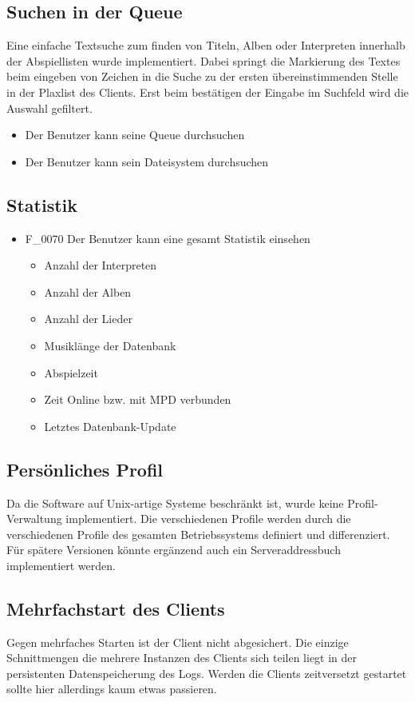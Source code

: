 \subsection{Suchen in der Queue}
Eine einfache Textsuche zum finden von Titeln, Alben oder Interpreten innerhalb der 
Abspiellisten wurde implementiert. Dabei springt die Markierung des Textes beim 
eingeben von Zeichen in die Suche zu der ersten übereinstimmenden Stelle in der 
Plaxlist des Clients. Erst beim bestätigen der Eingabe im Suchfeld wird die Auswahl 
gefiltert.
\begin{itemize}
	\item Der Benutzer kann seine Queue durchsuchen
	\item Der Benutzer kann sein Dateisystem durchsuchen
\end{itemize}
\subsection{Statistik}
\begin{itemize}
	\item F\_0070 Der Benutzer kann eine gesamt Statistik einsehen
	\begin{itemize}
		\item Anzahl der Interpreten
		\item Anzahl der Alben
		\item Anzahl der Lieder
		\item Musiklänge der Datenbank
		\item Abspielzeit	
		\item Zeit Online bzw. mit MPD verbunden
		\item Letztes Datenbank-Update
	\end{itemize}
\end{itemize}

\subsection{Persönliches Profil}
Da die Software auf Unix-artige Systeme beschränkt ist, wurde keine Profil-Verwaltung implementiert. Die
verschiedenen Profile werden durch die verschiedenen Profile des gesamten Betriebssystems definiert und differenziert.
Für spätere Versionen könnte ergänzend auch ein Serveraddressbuch implementiert werden.
\subsection{Mehrfachstart des Clients}
Gegen mehrfaches Starten ist der Client nicht abgesichert. Die einzige Schnittmengen die mehrere Instanzen des Clients sich teilen 
liegt in der persistenten Datenspeicherung des Logs. Werden die Clients zeitversetzt gestartet sollte hier allerdings kaum etwas passieren. 
